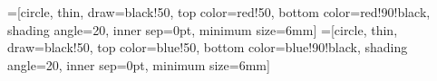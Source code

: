 \usepackage{siunitx} %
\usepackage[locale=FR]{siunitx}
\AtBeginDocument{\RenewCommandCopy\qty\SI}
\usepackage{physics}
	\DeclareSIUnit{}
	\DeclareSIUnit{}
	\DeclareSIUnit{}
	\DeclareSIUnit{}
	\DeclareSIUnit{}
	\DeclareSIUnit{}
	\DeclareSIUnit{}	
\setcounter{tocdepth}{1} %


        =[circle, thin, draw=black!50, top color=red!50, bottom color=red!90!black, shading angle=20, inner sep=0pt, minimum size=6mm]
        =[circle, thin, draw=black!50, top color=blue!50, bottom color=blue!90!black, shading angle=20, inner sep=0pt, minimum size=6mm]
        \newcommand{\poslading}[3][+]{\node[poslading] (#2) at (#3) {$#1$};}
        \newcommand{\neglading}[3][-]{\node[neglading] (#2) at (#3) {$#1$};}

